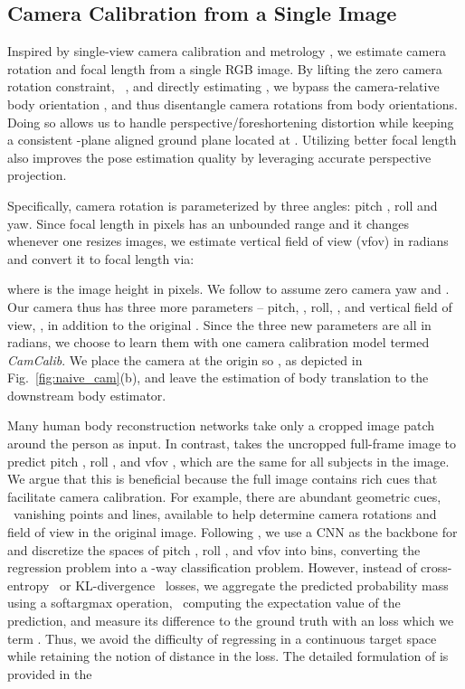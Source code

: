 \documentclass[10pt,twocolumn,letterpaper,usenames,dvipsnames]{article}
\begin{document}
\subsection{Camera Calibration from a Single Image}
\label{cam_calib}


Inspired by single-view camera calibration and metrology \cite{Hold-Geoffroy_2018_CVPR,Kendall_2015_ICCV,workman2016horizon,zhu2020single}, we estimate camera rotation  and focal length  from a single RGB image.
By lifting the zero camera rotation constraint, \ie~, and directly estimating , we bypass the camera-relative body orientation , and thus disentangle camera rotations from body orientations.
Doing so allows us to handle perspective/foreshortening distortion 
while keeping a consistent -plane aligned ground plane located at .
Utilizing better focal length also improves the pose estimation quality by leveraging accurate perspective projection. 

Specifically, camera rotation is parameterized by three angles: pitch , roll  and yaw. 
Since focal length in pixels has an unbounded range and it changes whenever one resizes images, we estimate vertical field of view (vfov)  in radians and convert it to focal length  via:

where  is the image height in pixels.
We follow \cite{zhu2020single} to assume zero camera yaw and .
Our camera thus has three more parameters -- pitch, , roll, , and vertical field of view, , in addition to the original .
Since the three new parameters are all in radians, we choose to learn them with one camera calibration model termed \emph{CamCalib}. 
We place the camera at the origin so , as depicted in Fig.~\ref{fig:naive_cam}(b), and leave the estimation of body translation  to the downstream body estimator.

Many human body reconstruction networks take only a cropped image patch around the person as input.
In contrast, \camcalib takes the uncropped full-frame image to predict pitch , roll , and vfov , which are the same for all subjects in the image.
We argue that this is beneficial because the full image contains rich cues that facilitate camera calibration. 
For example, there are abundant geometric cues, \eg~vanishing points and lines, available to help determine camera rotations and field of view in the original image. 
Following \cite{Hold-Geoffroy_2018_CVPR,Kendall_2015_ICCV,zhu2020single}, we use a CNN as the backbone for \camcalib and discretize the spaces of pitch , roll , and vfov  into  bins, converting the regression problem into a -way classification problem.
However, instead of cross-entropy~\cite{workman2016horizon} or KL-divergence~\cite{Hold-Geoffroy_2018_CVPR,zhu2020single} losses,
we aggregate the predicted probability mass using a softargmax operation, \ie~computing the expectation value of the prediction, and measure its difference to the ground truth with an \ltwo loss which we term \softltwo. 
Thus, we avoid the difficulty of regressing in a continuous target space while retaining the notion of distance in the loss.
The detailed formulation of \softltwo is provided in the \supmat 
\end{document}
